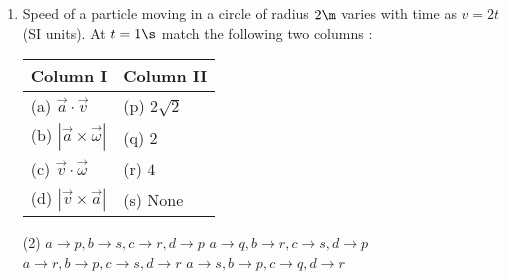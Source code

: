 \documentclass{article}
\renewcommand{\ans}{\quad}
\begin{document}
\begin{enumerate}
    \item Speed of a particle moving in a circle of radius $2 \m$ varies with time as $v = 2t$ (SI units). At $t = 1 \s$ match the following two columns :
    \begin{center}
        \renewcommand{\arraystretch}{1.5}
        \begin{table}[h]
            \centering
            \begin{tabular}{p{4cm}|p{3cm}}
            \hline
            Column I & Column II \\
            \hline
            (a) $\vec{a}\cdot \vec{v}$ & (p) $2\sqrt{2}$\\
            (b) $|\vec{a}\times \vec{\omega}|$ & (q) $2$\\
            (c) $\vec{v}\cdot\vec{\omega}$ & (r) $4$\\
            (d) $|\vec{v}\times \vec{a}|$ & (s) None\\
            \hline
            \end{tabular}
        \end{table}
    \end{center}
    \begin{tasks}(2)
        \task $a \rightarrow p, b \rightarrow s, c \rightarrow r, d \rightarrow p$
        \task $a \rightarrow q, b \rightarrow r, c \rightarrow s, d \rightarrow p$
        \task $a \rightarrow r, b \rightarrow p, c \rightarrow s, d \rightarrow r$\ans
        \task $a \rightarrow s, b \rightarrow p, c \rightarrow q, d \rightarrow r$
    \end{tasks}


\end{enumerate}
\end{document}
